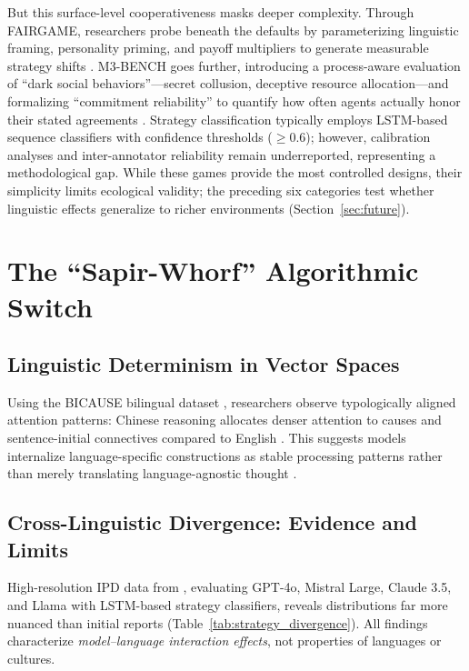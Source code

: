 \documentclass[11pt]{article}
\begin{document}
But this surface-level cooperativeness masks deeper complexity. Through FAIRGAME, researchers probe beneath the defaults by parameterizing linguistic framing, personality priming, and payoff multipliers to generate measurable strategy shifts \citep{huynh2025fairgame, buscemi2025fairgame}. M3-BENCH goes further, introducing a process-aware evaluation of ``dark social behaviors''---secret collusion, deceptive resource allocation---and formalizing ``commitment reliability'' to quantify how often agents actually honor their stated agreements \citep{xie2026m3bench}. Strategy classification typically employs LSTM-based sequence classifiers with confidence thresholds ($\geq 0.6$); however, calibration analyses and inter-annotator reliability remain underreported, representing a methodological gap. While these games provide the most controlled designs, their simplicity limits ecological validity; the preceding six categories test whether linguistic effects generalize to richer environments (Section~\ref{sec:future}).

\section{The ``Sapir-Whorf'' Algorithmic Switch}
\label{sec:linguistic_relativity}

\subsection{Linguistic Determinism in Vector Spaces}
\label{sec:revival}

Using the BICAUSE bilingual dataset \citep{jin2024bicause}, researchers observe typologically aligned attention patterns: Chinese reasoning allocates denser attention to causes and sentence-initial connectives compared to English \citep{wang2025babel}. This suggests models internalize language-specific constructions as stable processing patterns rather than merely translating language-agnostic thought \citep{wu2024semantichub, boroditsky2001does}.

\subsection{Cross-Linguistic Divergence: Evidence and Limits}
\label{sec:playstyles}

High-resolution IPD data from \citet{huynh2026moreatstake}, evaluating GPT-4o, Mistral Large, Claude 3.5, and Llama with LSTM-based strategy classifiers, reveals distributions far more nuanced than initial reports (Table~\ref{tab:strategy_divergence}). All findings characterize \textit{model--language interaction effects}, not properties of languages or cultures.
\end{document}
